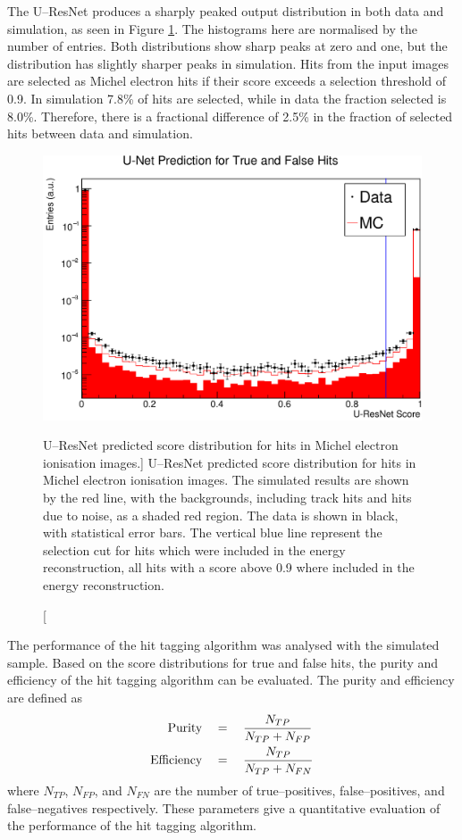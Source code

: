 The U--ResNet produces a sharply peaked output distribution in both data and
simulation, as seen in Figure \ref{fig:unet_pred_data}. The histograms here are
normalised by the number of entries. Both distributions show sharp peaks at zero
and one, but the distribution has slightly sharper peaks in simulation. Hits 
from the input images are selected as Michel electron hits if their score 
exceeds a selection threshold of 0.9. In simulation 7.8\% of hits are 
selected, while in data the fraction selected is 8.0\%. Therefore, there is a 
fractional difference of 2.5\% in the fraction of selected hits between data 
and simulation.  
\begin{figure}
	\centering
	\includegraphics[width=\textwidth]{figures/unet_pred_data.pdf}
	\caption
	[U--ResNet predicted score distribution for hits in Michel electron ionisation
	images.]
	{U--ResNet predicted score distribution for hits in Michel electron
	ionisation images. The simulated results are shown by the red line, with the
	backgrounds, including track hits and hits due to noise, as a shaded red 
	region. The data is shown in black, with statistical error bars. The vertical
	blue line represent the selection cut for hits which were included in the
	energy reconstruction, all hits with a score above 0.9 where included in the
	energy reconstruction.}
	\label{fig:unet_pred_data}
\end{figure}

The performance of the hit tagging algorithm was analysed with the simulated
sample. Based on the score distributions for true and false hits, the purity
and efficiency of the hit tagging algorithm can be evaluated. The purity and 
efficiency are defined as
\begin{align*}
	\mbox{Purity} \quad &= \quad  \frac{N_{TP}}{N_{TP} + N_{FP}} \\
	\vspace{2mm}
	\mbox{Efficiency} \quad &= \quad \frac{N_{TP}}{N_{TP} + N_{FN}}
\end{align*}
where $N_{TP}$, $N_{FP}$, and $N_{FN}$ are the number of true--positives,
false--positives, and false--negatives respectively. These parameters give a
quantitative evaluation of the performance of the hit tagging algorithm.

